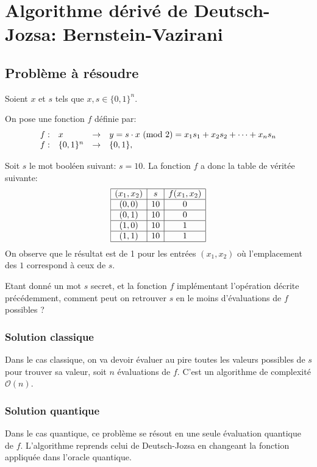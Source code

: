 \chapter{Algorithme dérivé de Deutsch-Jozsa: Bernstein-Vazirani}
\section{Problème à résoudre}

Soient $x$ et $s$ tels que $x, s \in \{0, 1\}^n$.

On pose une fonction $f$ définie par:
\[
  \begin{array}{llll}
    f :  &  x              & \to     & y = s \cdot x \ (\mathrm{mod}\ 2) = x_1 s_1 + x_2 s_2 + \dots + x_n s_n \\
    f:   &  \{0, 1\}^n     & \to     & \{0, 1\},
  \end{array}  
\]

\begin{ex}
  Soit $s$ le mot booléen suivant: $s = 10$. La fonction $f$ a donc la table de véritée suivante:
\[
  \begin{array}{|c|c|c|}
    \hline
   (x_1, x_2) & s & f(x_1,x_2) \\
    \hline
    (0,0) & 10 & 0 \\
    \hline
    (0,1) & 10 & 0 \\
    \hline
    (1,0) & 10 & 1 \\
    \hline
    (1,1) & 10 & 1 \\
    \hline
  \end{array}
\]
On observe que le résultat est de 1 pour les entrées $(x_1, x_2)$ où l'emplacement des $1$ correspond à ceux de $s$.
\end{ex}

\begin{pb}
Etant donné un mot $s$ secret, et la fonction $f$ implémentant l'opération décrite précédemment, comment peut on retrouver $s$ en le moins d'évaluations de $f$ possibles ?
\end{pb}

\subsection{Solution classique}
Dans le cas classique, on va devoir évaluer au pire toutes les valeurs possibles de $s$ pour trouver sa valeur, soit $n$ évaluations de $f$. C'est un algorithme de complexité $\mathcal{O}(n)$.

\subsection{Solution quantique}
Dans le cas quantique, ce problème se résout en une seule évaluation
quantique de $f$. L'algorithme reprends celui de Deutsch-Jozsa en changeant la fonction appliquée dans l'oracle quantique.

